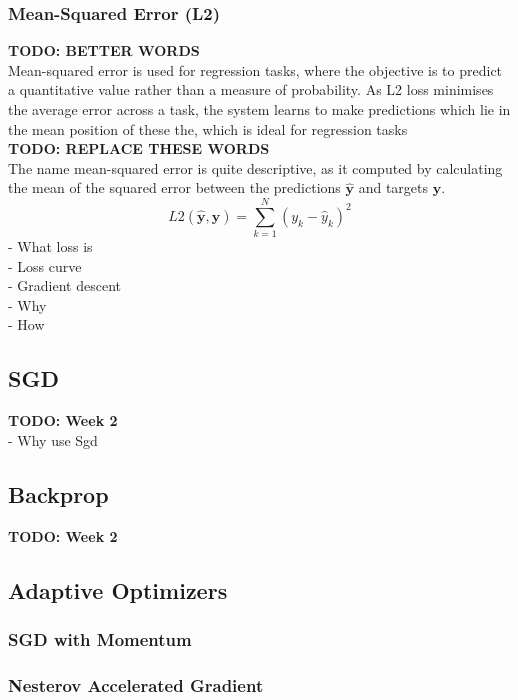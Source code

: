 \documentclass{report}
\begin{document}
	\subsubsection{Mean-Squared Error (L2)}
	\textbf{TODO: BETTER WORDS} \\
	Mean-squared error is used for regression tasks, where the objective is to predict a quantitative value rather than a measure of probability. As L2 loss minimises the average error across a task, the system learns to make predictions which lie in the mean position of these the, which is ideal for regression tasks \\
	\textbf{TODO: REPLACE THESE WORDS} \\
	The name mean-squared error is quite descriptive, as it computed by calculating the mean of the squared error between the predictions $\bm{\hat{y}}$ and targets $\bm{y}$. \\
	\begin{equation} \label{mean-squared-error:1}
	L2(\hat{\bm{y}}, \bm{y}) = \sum_{k=1}^{N}(y_k - \hat{y}_k)^2
	\end{equation}
	- What loss is \\
	- Loss curve \\
	- Gradient descent \\
		- Why \\
		- How \\
	
	\subsection{SGD}
	\textbf{TODO: Week 2} \\
	- Why use Sgd
	

	\subsection{Backprop}
	\textbf{TODO: Week 2} \\
	\subsection{Adaptive Optimizers}
	\subsubsection{SGD with Momentum}
	\subsubsection{Nesterov Accelerated Gradient}
\end{document}

